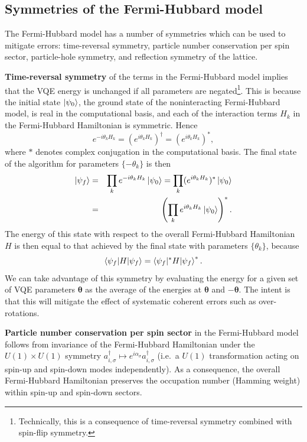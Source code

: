 \documentclass[aps,prb,twoside,superscriptaddress,longbibliography,nofootinbib,floatfix, notitlepage,twocolumn]{revtex4-1}
\renewcommand{\vec}[1]{\boldsymbol{#1}}
\begin{document}

\subsection{Symmetries of the Fermi-Hubbard model}
\label{app:symmetries}

The Fermi-Hubbard model has a number of symmetries which can be used to mitigate errors: time-reversal symmetry, particle number conservation per spin sector, particle-hole symmetry, and reflection symmetry of the lattice.

\textbf{Time-reversal symmetry} of the terms in the Fermi-Hubbard model implies that the VQE energy is unchanged if all parameters are negated\footnote{Technically, this is a consequence of time-reversal symmetry combined with spin-flip symmetry.}. This is because the initial state $\ket{\psi_0}$, the ground state of the noninteracting Fermi-Hubbard model, is real in the computational basis, and each of the interaction terms $H_k$ in the Fermi-Hubbard Hamiltonian is symmetric. Hence
%
\[ e^{-i \theta_k H_k} = \left(e^{i \theta_k H_k}\right)^\dag = \left(e^{i \theta_k H_k}\right)^*, \]
%
where $*$ denotes complex conjugation in the computational basis. The final state of the algorithm for parameters $\{-\theta_k\}$ is then
%
\begin{eqnarray*}
\ket{\psi_f} &=& \prod_k e^{-i \theta_k H_k} \ket{\psi_0} = \prod_k (e^{i \theta_k H_k})^* \ket{\psi_0}\\
&=& \left( \prod_k e^{i \theta_k H_k} \ket{\psi_0}\right)^*.
\end{eqnarray*}
%
The energy of this state with respect to the overall Fermi-Hubbard Hamiltonian $H$ is then equal to that achieved by the final state with parameters $\{\theta_k\}$, because
%
\[ \braket{\psi_f|H|\psi_f} = \braket{\psi_f|^*H|\psi_f}^*. \]
%
We can take advantage of this symmetry by evaluating the energy for a given set of VQE parameters $\vec{\theta}$ as the average of the energies at $\vec{\theta}$ and $-\vec{\theta}$. The intent is that this will mitigate the effect of systematic coherent errors such as over-rotations.

\textbf{Particle number conservation per spin sector} in the Fermi-Hubbard model follows from invariance of the Fermi-Hubbard Hamiltonian under the $U(1)\times U(1)$ symmetry $a^\dag_{i,\sigma} \mapsto e^{i\alpha_{\sigma}} a^\dag_{i,\sigma}$ (i.e.\ a $U(1)$ transformation acting on spin-up and spin-down modes independently). As a consequence, the overall Fermi-Hubbard Hamiltonian preserves the occupation number (Hamming weight) within spin-up and spin-down sectors.
\end{document}
